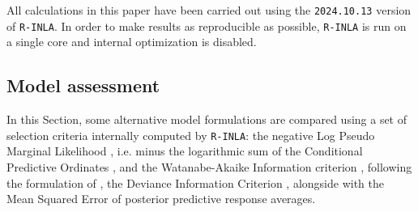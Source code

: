 \documentclass{book}
\begin{document}
All calculations in this paper have been carried out using the \texttt{2024.10.13} version of \texttt{R-INLA}. In order to make results as reproducible as possible, \texttt{R-INLA} is run on a single core \citep{Wang} and internal optimization is disabled.




\subsection{Model assessment} \label{par:criteria}

In this Section, some alternative model formulations are compared using a set of selection criteria internally computed by \texttt{R-INLA}: the negative Log Pseudo Marginal Likelihood \citep[LPML,][]{Geisser, Gelfand}, i.e. minus the logarithmic sum of the Conditional Predictive Ordinates \citep{CPO, CPOINLA}, and the Watanabe-Akaike Information criterion \citep[WAIC,][]{WAIC}, following the formulation of \citet{GelmanWAIC}, the Deviance Information Criterion \citep[DIC,][]{DIC}, alongside with the Mean Squared Error of posterior predictive response averages.


\end{document}
